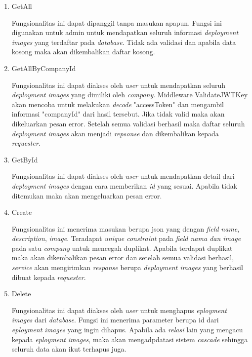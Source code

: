 \begin{enumerate}
  \item GetAll

        Fungsionalitas ini dapat dipanggil tanpa masukan apapun. Fungsi ini digunakan untuk admin untuk mendapatkan seluruh informasi \textit{deployment images} yang terdaftar pada \textit{database}. Tidak ada validasi dan apabila data kosong maka akan dikembalikan daftar kosong.

  \item GetAllByCompanyId

        Fungsionalitas ini dapat diakses oleh \textit{user} untuk mendapatkan seluruh \textit{deployment images} yang dimiliki oleh \textit{company}. Middleware ValidateJWTKey akan mencoba untuk melakukan \textit{decode} "accessToken" dan mengambil informasi "companyId" dari hasil tersebut. Jika tidak valid maka akan dikeluarkan pesan error. Setelah semua validasi berhasil maka daftar seluruh \textit{deployment images} akan menjadi \textit{repsonse} dan dikembalikan kepada \textit{requester}.

  \item GetById

        Fungsionalitas ini dapat diakses oleh \textit{user} untuk mendapatkan detail dari \textit{deployment images} dengan cara memberikan \textit{id} yang sesuai. Apabila tidak ditemukan maka akan mengeluarkan pesan error.

  \item Create

        Fungsionalitas ini menerima masukan berupa json yang dengan \textit{field} \textit{name}, \textit{description}, \textit{image}. Teradapat \textit{unique constraint} pada \textit{field nama dan image} pada satu \textit{company} untuk mencegah duplikat. Apabila terdapat duplikat maka akan dikembalikan pesan error dan setelah semua validasi berhasil, \textit{service} akan mengirimkan \textit{response} berupa \textit{deployment images} yang berhasil dibuat kepada \textit{requester}.

  \item Delete

        Fungsionalitas ini dapat diakses oleh \textit{user} untuk menghapus \textit{eployment images} dari \textit{database}. Fungsi ini menerima parameter berupa id dari \textit{eployment images} yang ingin dihapus. Apabila ada \textit{relasi} lain yang mengacu kepada \textit{eployment images}, maka akan mengadpdatasi sistem \textit{cascade} sehingga seluruh data akan ikut terhapus juga.

\end{enumerate}

